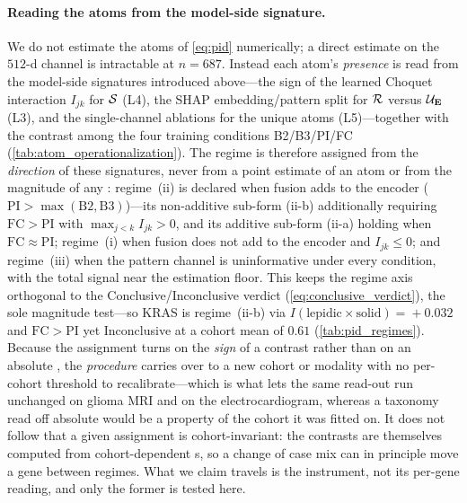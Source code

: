 \paragraph{Reading the atoms from the model-side signature.}
We do not estimate the atoms of \cref{eq:pid} numerically; a direct
estimate on the $512$-d channel is intractable at $n=687$. Instead each
atom's \emph{presence} is read from the model-side signatures introduced
above---the sign of the learned Choquet interaction $I_{jk}$ for
$\mathcal{S}$ (L4), the SHAP embedding/pattern split for $\mathcal{R}$ versus
$\mathcal{U}_{\mathbf{E}}$ (L3), and the single-channel ablations for the
unique atoms (L5)---together with the contrast among the four training
conditions B2/B3/PI/FC (\cref{tab:atom_operationalization}). The regime is
therefore assigned from the
\emph{direction} of these signatures, never from a point estimate of an
atom or from the magnitude of any \auroc{}: regime~(ii) is declared
when fusion adds to the encoder
($\mathrm{PI}\!>\!\max(\mathrm{B2},\mathrm{B3})$)---its non-additive
sub-form (ii-b) additionally requiring $\mathrm{FC}\!>\!\mathrm{PI}$
with $\max_{j<k} I_{jk}>0$, and its additive sub-form (ii-a) holding
when $\mathrm{FC}\!\approx\!\mathrm{PI}$; regime~(i) when fusion does
not add to the encoder and $I_{jk}\!\le\!0$; and regime~(iii) when the
pattern channel is uninformative under every condition, with the total
signal near the estimation floor. This keeps the regime axis orthogonal
to the Conclusive/Inconclusive verdict (\cref{eq:conclusive_verdict}),
the sole magnitude test---so KRAS is regime~(ii-b) via
$I(\text{lepidic}\!\times\!\text{solid})\!=\!+0.032$ and
$\mathrm{FC}\!>\!\mathrm{PI}$ yet Inconclusive at a cohort mean of
$0.61$ (\cref{tab:pid_regimes}).
Because the assignment turns on the \emph{sign} of a contrast rather than
on an absolute \auroc{}, the \emph{procedure} carries over to a new cohort or
modality with no per-cohort threshold to recalibrate---which is what lets the
same read-out run unchanged on glioma MRI and on the electrocardiogram,
whereas a taxonomy read off absolute \auroc{} would be a property of the
cohort it was fitted on. It does not follow that a given assignment is
cohort-invariant: the contrasts are themselves computed from
cohort-dependent \auroc{}s, so a change of case mix can in principle move a
gene between regimes. What we claim travels is the instrument, not its
per-gene reading, and only the former is tested here.

